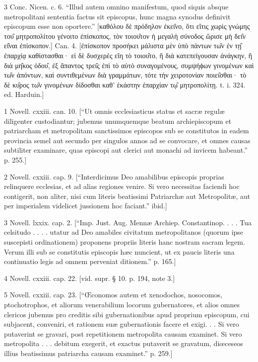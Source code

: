 3
Conc. Nicen. c. 6. “Illud autem omnino manifestum, quod siquis absque metropolitani sententia factus sit episcopus, hunc magna synodus definivit episcopum esse non oportere.” [καθόλου δὲ πρόδηλον ἐκει̑νο, ὅτι εἴτις χωρὶς γνώμης του̑ μητροπολίτου γένοιτο ἐπίσκοπος, τὸν τοιου̑τον ἡ μεγαλὴ σύνοδος ὥρισε μὴ δει̑ν εἰ̑ναι ἐπίσκοπον.] Can. 4. [ἐπίσκοπον προσήκει μάλιστα μὲν ὑπὸ πάντων τω̑ν ἐν τῃ̑ ἐπαρχίᾳ καθίστασθαι· εἰ δὲ δυσχερὲς εἴη τὸ τοιου̑το, ἢ διὰ κατεπείγουσαν ἀνάγκην, ἢ διὰ μη̑κος ὁδου̑, ἐξ ἅπαντος τρει̑ς ἐπὶ τὸ αὐτὸ συναγομένους, συμψήϕων γινομένων καὶ τω̑ν ἀπόντων, καὶ συντιθεμένων διὰ γραμμάτων, τότε τὴν χειροτονίαν ποιει̑σθαι· τὸ δὲ κυ̑ρος τω̑ν γινομένων δίδοσθαι καθ’ ἑκάστην ἐπαρχίαν τῳ̑ μητροπολίτῃ. t. i. 324. ed. Harduin.]

1
Novell. cxxiii. can. 10. [“Ut omnis ecclesiasticus status et sacræ regulæ diligenter custodiantur; jubemus unumquemque beatum archiepiscopum et patriarcham et metropolitam sanctissimos episcopos sub se constitutos in eadem provincia semel aut secundo per singulos annos ad se convocare, et omnes causas subtiliter examinare, quas episcopi aut clerici aut monachi ad invicem habeant.” p. 255.]

2
Novell. cxxiii. cap. 9. [“Interdicimus Deo amabilibus episcopis proprias relinquere ecclesias, et ad alias regiones venire. Si vero necessitas faciendi hoc contigerit, non aliter, nisi cum literis beatissimi Patriarchæ aut Metropolitæ, aut per imperialem videlicet jussionem hoc faciant.” ibid.]

3
Novell. lxxix. cap. 2. [“Imp. Just. Aug. Mennæ Archiep. Constantinop. . . . Tua celsitudo . . . . utatur ad Deo amabiles civitatum metropolitanos (quorum ipse suscepisti ordinationem) proponens propriis literis hanc nostram sacram legem. Verum illi sub se constitutis episcopis hæc nuncient, ut ex paucis literis una continuatio legis ad omnem perveniat ditionem.” p. 165.]

4
Novell. cxxiii. cap. 22. [vid. supr. § 10. p. 194, note 3.]

5
Novell. cxxiii. cap. 23. [“Œconomos autem et xenodochos, nosocomos, ptochotrophos, et aliorum venerabilium locorum gubernatores, et alios omnes clericos jubemus pro creditis sibi gubernationibus apud proprium episcopum, cui subjacent, conveniri, et rationem suæ gubernationis facere et exigi. . . Si vero putaverint se gravari, post repetitionem metropolita causam examinet. Si vero metropolita . . . debitum exegerit, et exactus putaverit se gravatum, diœceseos illius beatissimus patriarcha causam examinet.” p. 259.]

